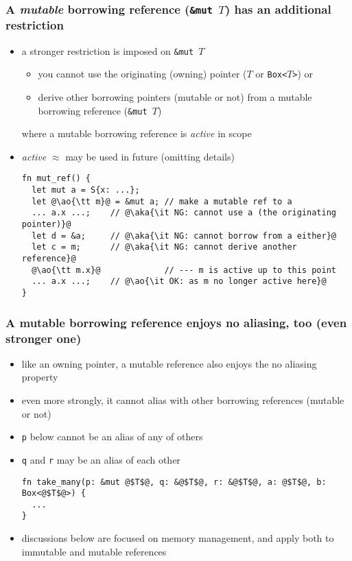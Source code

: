 \documentclass[12pt,dvipdfmx]{beamer}
\newcommand{\ao}[1]{{\color{blue}#1}}
\newcommand{\aka}[1]{{\color{red}#1}}
\begin{document}
\begin{frame}[fragile]
  \frametitle{A {\it mutable} borrowing reference ({\tt \&mut $T$}) has
    an additional restriction}
  \begin{itemize}
  \item a stronger restriction is imposed on {\tt \&mut $T$}
    \begin{itemize}
    \item you cannot use the originating (owning) pointer
      ($T$ or {\tt Box<$T$>}) or
    \item derive other borrowing pointers (mutable or not)
      from a mutable borrowing
      reference ({\tt \&mut $T$})
    \end{itemize}
    where a mutable borrowing reference is {\it active} in scope
  \item {\it active} $\approx$ may be used in future (omitting details)
\begin{lstlisting}
fn mut_ref() {      
  let mut a = S{x: ...};
  let @\ao{\tt m}@ = &mut a; // make a mutable ref to a
  ... a.x ...;    // @\aka{\it NG: cannot use a (the originating pointer)}@
  let d = &a;     // @\aka{\it NG: cannot borrow from a either}@
  let c = m;      // @\aka{\it NG: cannot derive another reference}@
  @\ao{\tt m.x}@             // --- m is active up to this point
  ... a.x ...;    // @\ao{\it OK: as m no longer active here}@
}
\end{lstlisting}
\end{itemize}
\end{frame}

\begin{frame}[fragile]
  \frametitle{A mutable borrowing reference enjoys no aliasing, too
    (even stronger one)}
  \begin{itemize}
  \item like an owning pointer, a mutable reference also enjoys
    the no aliasing property
  \item even more strongly, it cannot alias with other borrowing references
    (mutable or not)
  \item {\tt p} below cannot be an alias of any of others
  \item {\tt q} and {\tt r} may be an alias of each other
\begin{lstlisting}
fn take_many(p: &mut @$T$@, q: &@$T$@, r: &@$T$@, a: @$T$@, b: Box<@$T$@>) {
  ...
}    
\end{lstlisting}
    
\item discussions below are focused on memory management,
  and apply both to immutable and mutable references
\end{itemize}
\end{frame}
\end{document}
